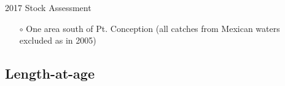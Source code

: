 \documentclass[ignorenonframetext,compress]{beamer}
\def\begincols{\begin{columns}}
\def\begincol{\begin{column}}
\begin{document}
\begin{frame}{2017 Stock Assessment}

\begin{itemize}
\item[$\circ$] One area south of Pt. Conception (all catches from Mexican waters excluded as in 2005)
\end{itemize}

\end{frame}

\subsection{Length-at-age}\label{length-at-age}

\end{document}
